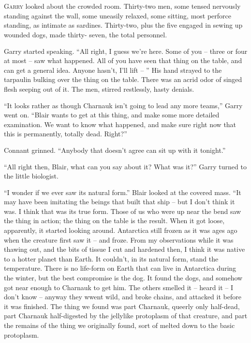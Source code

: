 \documentclass[letterpaper,openany,12pt]{memoir}		%
\begin{document}
\chapter[Chapter 6]{}

\lettrine[lines=3,findent=2pt,nindent=2pt]{G}{arry} looked about the crowded
room. Thirty-two men, some tensed nervously standing against the wall, some
uneasily relaxed, some sitting, most perforce standing, as intimate as sardines.
Thirty-two, plus the five engaged in sewing up wounded dogs, made thirty- seven,
the total personnel.

Garry started speaking. ``All right, I guess we're here. Some of you -- three or
four at most -- saw what happened. All of you have seen that thing on the table,
and can get a general idea. Anyone hasn't, I'll lift -- '' His hand strayed to
the tarpaulin bulking over the thing on the table. There was an acrid odor of
singed flesh seeping out of it. The men, stirred restlessly, hasty denials.

``It looks rather as though Charnauk isn't going to lead any more teams,'' Garry
went on. ``Blair wants to get at this thing, and make some more detailed
examination. We want to know what happened, and make sure right now that this is
permanently, totally dead. Right?''

Connant grinned. ``Anybody that doesn't agree can sit up with it tonight.''

``All right then, Blair, what can you say about it? What was it?'' Garry turned
to the little biologist.

``I wonder if we ever saw its natural form.'' Blair looked at the covered mass.
``It may have been imitating the beings that built that ship -- but I don't
think it was. I think that was its true form. Those of us who were up near the
bend saw the thing in action; the thing on the table is the result. When it got
loose, apparently, it started looking around. Antarctica still frozen as it was
ages ago when the creature first saw it -- and froze. From my observations while
it was thawing out, and the bits of tissue I cut and hardened then, I think it
was native to a hotter planet than Earth. It couldn't, in its natural form,
stand the temperature. There is no life-form on Earth that can live in
Antarctica during the winter, but the best compromise is the dog. It found the
dogs, and somehow got near enough to Charnauk to get him. The others smelled it
-- heard it -- I don't know -- anyway they wwent wild, and broke chains, and
attacked it before it was finished. The thing we found was part Charnauk,
queerly only half-dead, part Charnauk half-digested by the jellylike protoplasm
of that creature, and part the remains of the thing we originally found, sort of
melted down to the basic protoplasm.
\end{document}
